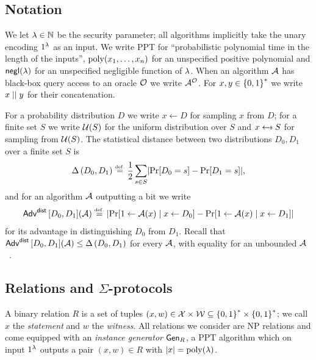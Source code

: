 
\subsection{Notation}\label{sec:notation}

We let $\lambda \in \mathbb{N}$ be the security parameter; all algorithms implicitly take
the unary encoding $1^{\lambda}$ as an input.
We write PPT for ``probabilistic polynomial time in the length of the inputs'',
$\operatorname{poly}(x_1 , \ldots, x_n)$ for an unspecified positive polynomial and
$\mathsf{negl}(\lambda)$ for an unspecified negligible function of $\lambda$.
When an algorithm $\mathcal{A}$ has black-box query access to an oracle $\mathcal{O}$ we write
$\mathcal{A}^{\mathcal{O}}$.
For $x, y \in \left\{0,1\right\}^*$ we write $x \mathrel{||} y$ for their concatenation.

For a probability distribution $D$ we write $x \gets D$ for sampling $x$
from $D$; for a finite set $S$ we write $\mathcal{U}(S)$ for the uniform
distribution over $S$ and $x \sample S$ for sampling from $\mathcal{U}(S)$.
The statistical distance between two distributions $D_0, D_1$ over a finite set
$S$ is
\begin{equation}
    \statdist{D_0}{D_1} \defeq
    \frac{1}{2} \sum_{s \in S} \abs{\Pr[D_0 = s] - \Pr[D_1 = s]},
\end{equation}
and for an algorithm $\mathcal{A}$ outputting a bit we write
\begin{equation}
    \mathsf{Adv}^{\mathsf{dist}}\left[D_0, D_1\right]\!\left(\mathcal{A}\right) \overset{\scriptscriptstyle\mathrm{def.}}{=}
    \lvert \Pr[1 \gets \mathcal{A}(x) \mid x \gets D_0] - \Pr[1 \gets \mathcal{A}(x) \mid x \gets D_1] \rvert
\end{equation}
for its advantage in distinguishing $D_0$ from $D_1$.
Recall that $\mathsf{Adv}^{\mathsf{dist}}\left[D_0, D_1\right]\!\left(\mathcal{A}\right) \leq \Delta\left(D_0, D_1\right)$ for every
$\mathcal{A}$, with equality for an unbounded $\mathcal{A}$~\cite[Proposition~2.3]{C:ABDPW25}.

\subsection{Relations and \texorpdfstring{$\Sigma$}{Sigma}-protocols}\label{sec:sigma}

A binary relation $R$ is a set of tuples $(x,w) \in \mathcal{X} \times \mathcal{W} \subseteq
\left\{0,1\right\}^* \times \left\{0,1\right\}^*$; we call $x$ the \emph{statement} and $w$ the
\emph{witness}.
All relations we consider are NP relations and come equipped with an
\emph{instance generator} $\operatorname{\mathsf{Gen}}_R$, a PPT algorithm which on input $1^{\lambda}$
outputs a pair $(x,w) \in R$ with $\lvert x \rvert = \operatorname{poly}(\lambda)$.

